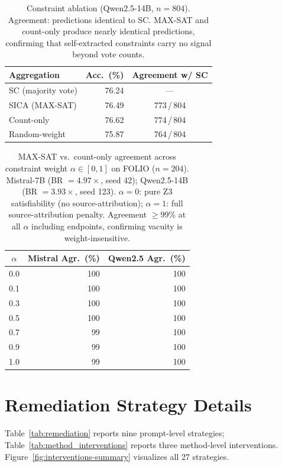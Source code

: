 \begin{table}[h]
\centering
\small
\caption{Constraint ablation (Qwen2.5-14B, $n = 804$). Agreement: predictions identical to SC. MAX-SAT and count-only produce nearly identical predictions, confirming that self-extracted constraints carry no signal beyond vote counts.}
\label{tab:ablation}
\begin{tabular}{@{}lrc@{}}
\toprule
Aggregation & Acc.\ (\%) & Agreement w/ SC \\
\midrule
SC (majority vote) & 76.24 & --- \\
SICA (MAX-SAT) & 76.49 & 773\,/\,804 \\
Count-only & 76.62 & 774\,/\,804 \\
Random-weight & 75.87 & 764\,/\,804 \\
\bottomrule
\end{tabular}
\end{table}

\begin{table}[h]
\centering
\small
\caption{MAX-SAT vs.\ count-only agreement across constraint weight $\alpha \in [0,1]$ on FOLIO ($n = 204$). Mistral-7B (BR $= 4.97\times$, seed 42); Qwen2.5-14B (BR $= 3.93\times$, seed 123). $\alpha{=}0$: pure Z3 satisfiability (no source-attribution); $\alpha{=}1$: full source-attribution penalty. Agreement $\geq 99\%$ at all $\alpha$ including endpoints, confirming vacuity is weight-insensitive.}
\label{tab:alpha-ablation}
\begin{tabular}{@{}crr@{}}
\toprule
$\alpha$ & Mistral Agr.\ (\%) & Qwen2.5 Agr.\ (\%) \\
\midrule
0.0 & 100 & 100 \\
0.1 & 100 & 100 \\
0.3 & 100 & 100 \\
0.5 & 100 & 100 \\
0.7 & 99 & 100 \\
0.9 & 99 & 100 \\
1.0 & 99 & 100 \\
\bottomrule
\end{tabular}
\end{table}


\section{Remediation Strategy Details}
\label{app:remediation}

Table~\ref{tab:remediation} reports nine prompt-level strategies; Table~\ref{tab:method_interventions} reports three method-level interventions. Figure~\ref{fig:interventions-summary} visualizes all 27 strategies.

